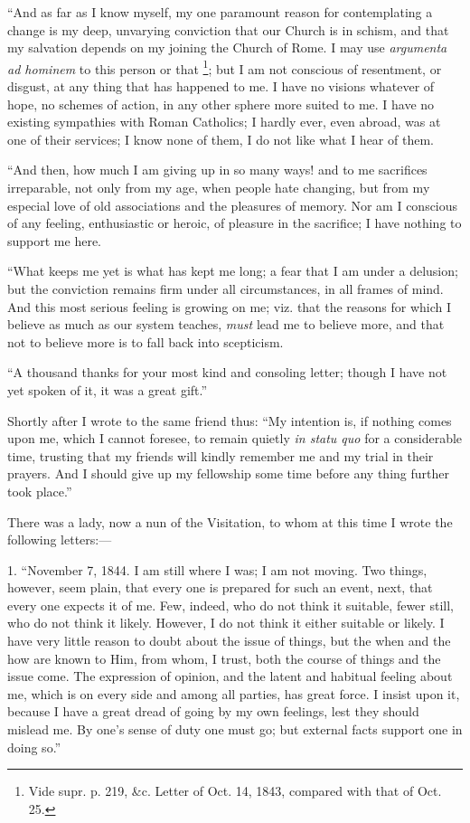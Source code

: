 ``And as far as I know myself, my one paramount reason for
contemplating a change is my deep, unvarying conviction that our Church
is in schism, and that my salvation depends on my joining the Church of
Rome. I may use \emph{argumenta ad hominem} to this person or that \footnote{Vide supr. p. 219,
\&c. Letter of Oct. 14, 1843, compared with that of Oct. 25.}; but I am not conscious of resentment, or disgust, at any thing
that has happened to me. I have no visions whatever of hope, no schemes
of action, in any other sphere more suited to me. I have no existing
sympathies with Roman Catholics; I hardly ever, even abroad, was at one
of their services; I know none of them, I do not like what I hear of
them.

``And then, how much I am giving up in so many ways!
and to me sacrifices irreparable, not only from my age, when people hate
changing, but from my especial love of old associations and the
pleasures of memory. Nor am I conscious of any feeling, enthusiastic or
heroic, of pleasure in the sacrifice; I have nothing to support me here.

``What keeps me yet is what has kept me long; a fear that I
am under a delusion; but the conviction remains firm under all
circumstances, in all frames of mind. And this most serious feeling is
growing on me; viz. that the reasons for which I believe as much as our
system teaches, \emph{must} lead me to believe more, and that not to
believe more is to fall back into scepticism.

``A thousand thanks for your most kind and consoling letter;
though I have not yet spoken of it, it was a great gift.''

Shortly after I wrote to the same friend thus: ``My intention is, if nothing comes upon me, which I cannot
foresee, to remain quietly \emph{in statu quo} for a considerable time,
trusting that my friends will kindly remember me and my trial in their
prayers. And I should give up my fellowship some time before any thing
further took place.''

There was a lady, now a nun of the Visitation, to whom at this time I wrote the following letters:—

1. ``November 7, 1844. I am still where I was; I am
not moving. Two things, however, seem plain, that every one is prepared
for such an event, next, that every one expects it of me. Few, indeed,
who do not think it suitable, fewer still, who do not think it likely.
However, I do not think it either suitable or likely. I have very little
reason to doubt about the issue of things, but the when and the how are
known to Him, from whom, I trust, both the course of things and the
issue come. The expression of opinion, and the latent and habitual
feeling about me, which is on every side and among all parties, has
great force. I insist upon it, because I have a great dread of going by
my own feelings, lest they should mislead me. By one's sense of duty one
must go; but external facts support one in doing so.''

